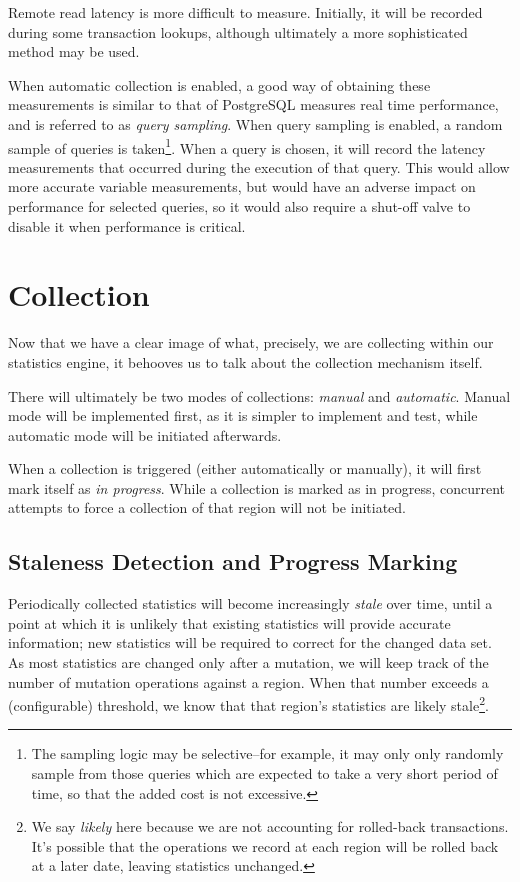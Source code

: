 Remote read latency is more difficult to measure. Initially, it will be recorded during some transaction lookups, although ultimately a more sophisticated method may be used.

When automatic collection is enabled, a good way of obtaining these measurements is similar to that of PostgreSQL\cite{PGCollector} measures real time performance, and is referred to as \emph{query sampling}. When query sampling is enabled, a random sample of queries is taken\footnote{The sampling logic may be selective--for example, it may only only randomly sample from those queries which are expected to take a very short period of time, so that the added cost is not excessive.}. When a query is chosen, it will record the latency measurements that occurred during the execution of that query. This would allow more accurate variable measurements, but would have an adverse impact on performance for selected queries, so it would also require a shut-off valve to disable it when performance is critical.

\section{Collection}
\label{sec:Collection}
Now that we have a clear image of what, precisely, we are collecting within our statistics engine, it behooves us to talk about the collection mechanism itself.

There will ultimately be two modes of collections: \emph{manual} and \emph{automatic}. Manual mode will be implemented first, as it is simpler to implement and test, while automatic mode will be initiated afterwards.

When a collection is triggered (either automatically or manually), it will first mark itself as \emph{in progress}. While a collection is marked as in progress, concurrent attempts to force a collection of that region will not be initiated.

\subsection{Staleness Detection and Progress Marking}
Periodically collected statistics will become increasingly \emph{stale} over time, until a point at which it is unlikely that existing statistics will provide accurate information; new statistics will be required to correct for the changed data set. As most statistics are changed only after a mutation, we will keep track of the number of mutation operations against a region. When that number exceeds a (configurable) threshold, we know that that region's statistics are likely stale\footnote{We say \emph{likely} here because we are not accounting for rolled-back transactions. It's possible that the operations we record at each region will be rolled back at a later date, leaving statistics unchanged.}. 

